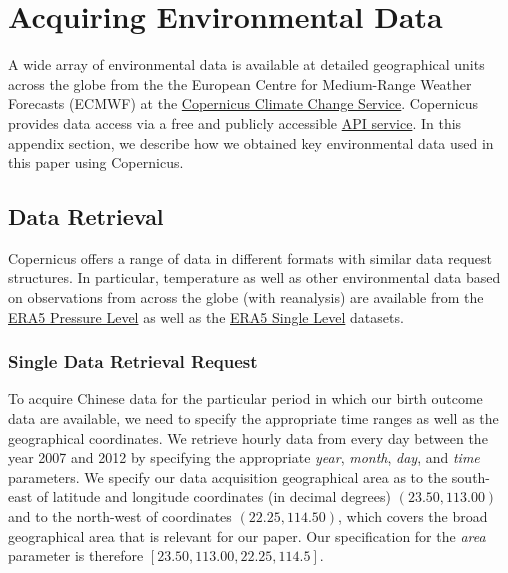 \pagebreak 

\renewcommand{\thefigure}{B.\arabic{figure}}
\setcounter{figure}{0}
\renewcommand{\thetable}{B.\arabic{table}}
\setcounter{table}{0}
\renewcommand{\theequation}{B.\arabic{equation}}
\setcounter{equation}{0}
\renewcommand{\thefootnote}{B.\arabic{footnote}}
\setcounter{footnote}{0}

\section{Acquiring Environmental Data\label{sec:appdata}}

A wide array of environmental data is available at detailed geographical units across the globe from the the European Centre for Medium-Range Weather Forecasts (ECMWF)
at the \href{https://cds.climate.copernicus.eu/}{Copernicus Climate Change Service}. 
Copernicus provides data access via a free and publicly accessible \href{https://cds.climate.copernicus.eu/api-how-to}{API service}. In this appendix section, we describe how we obtained key environmental data used in this paper using Copernicus. 

\subsection{Data Retrieval}

Copernicus offers a range of data in different formats with similar data request structures. In particular, temperature as well as other environmental data based on observations from across the globe (with reanalysis) are available from the \href{https://cds.climate.copernicus.eu/cdsapp#!/dataset/reanalysis-era5-pressure-levels?tab=overview}{ERA5 Pressure Level} as well as the \href{https://cds.climate.copernicus.eu/cdsapp#!/dataset/reanalysis-era5-single-levels?tab=overview}{ERA5 Single Level} datasets.

\subsubsection{Single Data Retrieval Request}

To acquire Chinese data for the particular period in which our birth outcome data are available, we need to specify the appropriate time ranges as well as the geographical coordinates. We retrieve hourly data from every day between the year 2007 and 2012 by specifying the appropriate \emph{year}, \emph{month}, \emph{day}, and \emph{time} parameters. We specify our data acquisition geographical area as to the south-east of latitude and longitude coordinates (in decimal degrees) $\left(23.50, 113.00\right)$ and to the north-west of coordinates $\left(22.25, 114.50\right)$, which covers the broad geographical area that is relevant for our paper. Our specification for the \emph{area} parameter is therefore $[23.50, 113.00, 22.25, 114.5]$. 

